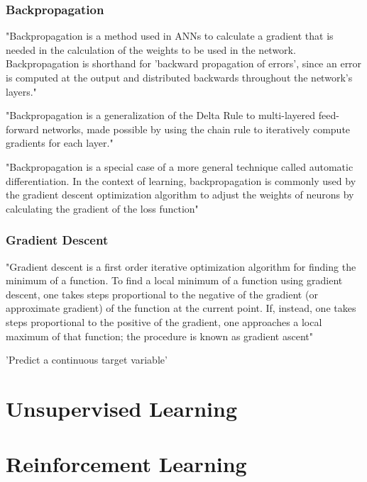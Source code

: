 \subsubsection{Backpropagation}

"Backpropagation is a method used in ANNs to calculate a gradient that is needed in the calculation of the weights to be used in the network. Backpropagation is shorthand for 'backward propagation of errors', since an error is computed at the output and distributed backwards throughout the network's layers."

"Backpropagation is a generalization of the Delta Rule to multi-layered feed-forward networks, made possible by using the chain rule to iteratively compute gradients for each layer."

"Backpropagation is a special case of a more general technique called automatic differentiation. In the context of learning, backpropagation is commonly used by the gradient descent optimization algorithm to adjust the weights of neurons by calculating the gradient of the loss function"

\subsubsection{Gradient Descent}


"Gradient descent is a first order iterative optimization algorithm for finding the minimum of a function. To find a local minimum of a function using gradient descent, one takes steps proportional to the negative of the gradient (or approximate gradient) of the function at the current point. If, instead, one takes steps proportional to the positive of the gradient, one approaches a local maximum of that function; the procedure is known as gradient ascent"

'Predict a continuous target variable'

\section{Unsupervised Learning}


\section{Reinforcement Learning}

